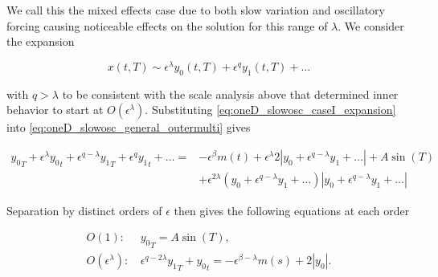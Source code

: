 We call this the mixed effects case due to both slow variation and oscillatory forcing causing noticeable effects on the solution for this range of $\lambda$. We consider the expansion

\begin{equation}\label{eq:oneD_slowosc_caseI_expansion}
x(t,T)\sim \epsilon^{\lambda} y_0(t,T)+\epsilon^q y_1(t,T)+\ldots
\end{equation}

with $q>\lambda$ to be consistent with the scale analysis above that determined inner behavior to start at $O(\epsilon^\lambda)$. Substituting \eqref{eq:oneD_slowosc_caseI_expansion} into \eqref{eq:oneD_slowosc_general_outermulti} gives

\begin{equation*}
\begin{aligned}
{y_0}_T+\epsilon^{\lambda}{y_0}_t+\epsilon^{q-\lambda} {y_1}_T+\epsilon^{q} {y_1}_t+\ldots={} & -\epsilon^{\beta}m(t)+\epsilon^\lambda 2|y_0 +\epsilon^{q-\lambda} y_1+\ldots|+ A\sin(T) \\
& + \epsilon^{2\lambda}( y_0 +\epsilon^{q-\lambda} y_1+\ldots)|y_0 +\epsilon^{q-\lambda} y_1+\ldots |
\end{aligned}
\end{equation*}

Separation by distinct orders of $\epsilon$ then gives the following equations at each order

\begin{align} \label{eq:oneD_slowosc_caseI_O1}
O(1):\, & {y_0}_T = A\sin(T),\\ \label{eq:oneD_slowosc_caseI_O2}
O(\epsilon^\lambda): \, & \epsilon^{q-2\lambda}{y_1}_T+{y_0}_t=-\epsilon^{\beta-\lambda}m(s)+2|y_0|.
\end{align}


